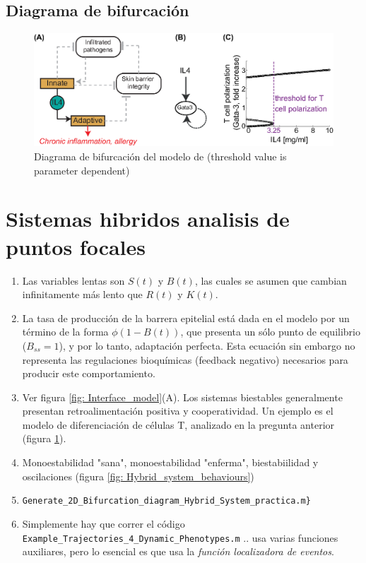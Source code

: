 \documentclass[10pt,letterpaper]{article}
\begin{document}
\subsection{Diagrama de bifurcación}





\begin{figure}[h!]
  \centering
 \includegraphics[scale=1]{GATA_model} 
  \caption{Diagrama de bifurcación del modelo de \cite{Hofer2002} (threshold value is parameter dependent)}
 \label{fig:Gata3_model}
\end{figure}

\section{Sistemas hibridos analisis de puntos focales} 

\begin{enumerate}
\item Las variables lentas son $S(t)$ y $B(t)$, las cuales se asumen que cambian infinitamente más lento que $R(t)$ y $K(t)$. 
\item La tasa de producción de la barrera epitelial está dada en el modelo por un término de la forma $\phi  \left(1-B(t)\right)$, que presenta un sólo punto de equilibrio ($B_{ss}=1$), y por lo tanto, adaptación perfecta. Esta ecuación sin embargo no representa las regulaciones bioquímicas (feedback negativo) necesarios para producir este comportamiento.
\item Ver figura \ref{fig: Interface_model}(A). Los sistemas biestables generalmente presentan retroalimentación positiva y cooperatividad. Un ejemplo es el modelo de diferenciación de células T, analizado en la pregunta anterior (figura \ref{fig:Gata3_model}).
\item Monoestabilidad "sana", monoestabilidad "enferma", biestabiilidad y oscilaciones (figura  \ref{fig: Hybrid_system_behaviours})
\item  \verb|Generate_2D_Bifurcation_diagram_Hybrid_System_practica.m}|\item Simplemente hay que correr el código \verb|Example_Trajectories_4_Dynamic_Phenotypes.m| .. usa varias funciones auxiliares, pero lo esencial es que usa la \textit{función localizadora de eventos}.
\end{enumerate}
\end{document}
